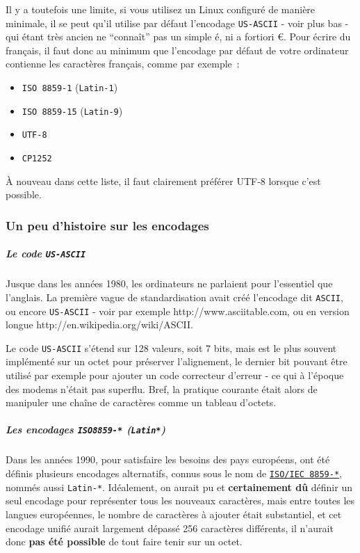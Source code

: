 Il y a toutefois une limite, si vous utilisez un Linux configuré de
manière minimale, il se peut qu'il utilise par défaut l'encodage
\texttt{US-ASCII} - voir plus bas - qui étant très ancien ne ``connaît''
pas un simple é, ni a fortiori €. Pour écrire du français, il faut donc
au minimum que l'encodage par défaut de votre ordinateur contienne les
caractères français, comme par exemple~:

\begin{itemize}
\tightlist
\item
  \texttt{ISO\ 8859-1} (\texttt{Latin-1})
\item
  \texttt{ISO\ 8859-15} (\texttt{Latin-9})
\item
  \texttt{UTF-8}
\item
  \texttt{CP1252}
\end{itemize}

À nouveau dans cette liste, il faut clairement préférer UTF-8 lorsque
c'est possible.

    \hypertarget{un-peu-dhistoire-sur-les-encodages}{%
\subsubsection{Un peu d'histoire sur les
encodages}\label{un-peu-dhistoire-sur-les-encodages}}

    \hypertarget{le-code-us-ascii}{%
\subparagraph{\texorpdfstring{Le code
\texttt{US-ASCII}}{Le code US-ASCII}}\label{le-code-us-ascii}}

    Jusque dans les années 1980, les ordinateurs ne parlaient pour
l'essentiel que l'anglais. La première vague de standardisation avait
créé l'encodage dit \texttt{ASCII}, ou encore \texttt{US-ASCII} - voir
par exemple http://www.asciitable.com, ou en version longue
http://en.wikipedia.org/wiki/ASCII.

Le code \texttt{US-ASCII} s'étend sur 128 valeurs, soit 7 bits, mais est
le plus souvent implémenté sur un octet pour préserver l'alignement, le
dernier bit pouvant être utilisé par exemple pour ajouter un code
correcteur d'erreur - ce qui à l'époque des modems n'était pas superflu.
Bref, la pratique courante était alors de manipuler une chaîne de
caractères comme un tableau d'octets.

    \hypertarget{les-encodages-iso8859--latin}{%
\subparagraph{\texorpdfstring{Les encodages \texttt{ISO8859-*}
(\texttt{Latin*})}{Les encodages ISO8859-* (Latin*)}}\label{les-encodages-iso8859--latin}}

    Dans les années 1990, pour satisfaire les besoins des pays européens,
ont été définis plusieurs encodages alternatifs, connus sous le nom de
\href{http://en.wikipedia.org/wiki/ISO/IEC_8859}{\texttt{ISO/IEC\ 8859-*}},
nommés aussi \texttt{Latin-*}. Idéalement, on aurait pu et
\textbf{certainement dû} définir un seul encodage pour représenter tous
les nouveaux caractères, mais entre toutes les langues européennes, le
nombre de caractères à ajouter était substantiel, et cet encodage unifié
aurait largement dépassé 256 caractères différents, il n'aurait donc
\textbf{pas été possible} de tout faire tenir sur un octet.

